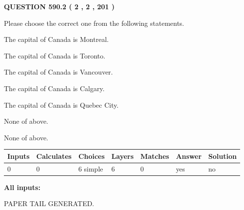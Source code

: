 \documentclass[12pt]{article}
\begin{document}
\vspace{0.2in}
  
{\textbf{\Large{QUESTION
590.2 
 ( 2 , 2 , 201 )
}}}
  
  
Please choose the correct one from the following statements.
 
 
The capital of Canada is Montreal.
 
 
The capital of Canada is Toronto.
 
 
The capital of Canada is Vancouver.
 
 
The capital of Canada is Calgary.
 
 
The capital of Canada is Quebec City.
 
 
 None of above.
 
 
\noindent{}
 
 
 None of above.
 
 
\noindent{}
 
 
   
   
   
   
\noindent\begin{tabular}{|l|l|l|l|l|l|l|}
 \hline
Inputs & Calculates & Choices & Layers & Matches & Answer & Solution \\ \hline
 0  & 
 0  & 
 6
  simple  
  & 
 6  & 
 0  & 
  yes & 
  no 
  \\ \hline
 \end{tabular}
   
   
   
   
\noindent{}
   
   
   
   
\noindent\vspace{0.1in}\hspace{-0.08in} {\textbf{\Large{All inputs: }}}
   
   
   
   
   
   
 \vspace{0.2in}
 
   
   
\vspace{2.0in} PAPER TAIL GENERATED.
   
\end{document}
